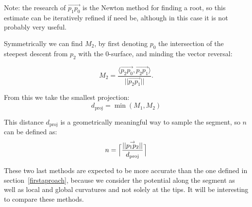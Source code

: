 \documentclass[11pt,a4paper]{article}
\newcommand{\gvec}[1]{\ensuremath{\overset{\rightarrow}{#1}}}
\newcommand{\scal}[2]{\ensuremath{\langle #1 , #2 \rangle}}
\begin{document}
Note: the research of $\gvec{p_1p_0}$ is the Newton method for finding a root, so this estimate can be iteratively refined if need be, although in this case it is not probably very useful. 
%
%
%

Symmetrically we can find $M_2$, by first denoting $p_0$ the intersection of the steepest descent from $p_2$ with the 0-surface, and minding the vector reversal: 

%
\begin{equation}
M_2 =  \frac{\scal{\gvec{p_2p_0}}{\gvec{p_2p_1}}}{||\gvec{p_2p_1}||}.
\end{equation}

From this we take the smallest projection:
\begin{equation}
d_{\text{proj}} = \min(M_1,M_2)
\end{equation}

This distance $d_{\text{proj}}$ is a geometrically meaningful way to sample the segment, so $n$ can be defined as:
\begin{equation}
n = \Bigl\lceil\frac{||\gvec{p_1p_2}||}{d_{\text{proj}}}\Bigr\rceil
\end{equation}

These two last methods are expected to be more accurate than the one defined in section~\ref{firstaproach}, because we consider the potential along the segment as well as local and global curvatures and not solely at the tips. It will be interesting to compare these methods.
\end{document}
